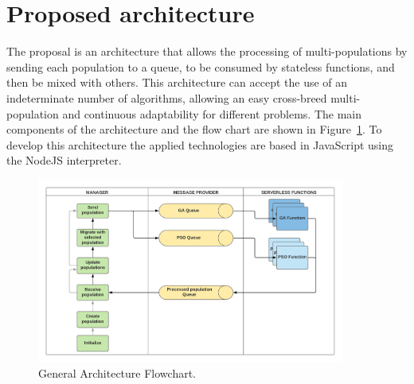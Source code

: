 \documentclass[runningheads]{llncs}
\begin{document}




\section{Proposed architecture}
\label{sec:architecture}

The proposal is an architecture that allows the processing of multi-populations
by sending each population to a queue, to be consumed by stateless functions,
and then be mixed with others.  This architecture can accept the use of an
indeterminate number of algorithms, allowing an easy cross-breed
multi-population and continuous adaptability for different problems. 
The main components of the architecture and the flow chart are shown 
in Figure~\ref{flow}. To develop this architecture the applied technologies are based in JavaScript
using the NodeJS interpreter. 

\begin{figure}[htp]
  \centering
  \includegraphics[width=0.9\textwidth]{img/architecture.png}
  \caption{General Architecture Flowchart.} \label{flow}
  \end{figure}
\end{document}
